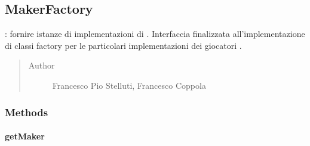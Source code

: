 \documentclass[letterpaper,10pt,italian,openany,oneside]{sphinxmanual}
\begin{document}
\begin{fulllineitems}
\label{\detokenize{test/it/unicam/cs/pa/mastermind/factories/InteractiveMakerFactory:it.unicam.cs.pa.mastermind.factories.InteractiveMakerFactory.getName()}}
\end{fulllineitems}



\subsection{MakerFactory}
\label{\detokenize{test/it/unicam/cs/pa/mastermind/factories/MakerFactory:makerfactory}}\label{\detokenize{test/it/unicam/cs/pa/mastermind/factories/MakerFactory::doc}}

\begin{fulllineitems}
\label{\detokenize{test/it/unicam/cs/pa/mastermind/factories/MakerFactory:it.unicam.cs.pa.mastermind.factories.MakerFactory}}
: fornire istanze di implementazioni di . Interfaccia finalizzata all’implementazione di classi factory per le particolari implementazioni dei giocatori .
\begin{quote}\begin{description}
\item[{Author}] \leavevmode
Francesco Pio Stelluti, Francesco Coppola

\end{description}\end{quote}

\end{fulllineitems}



\subsubsection{Methods}
\label{\detokenize{test/it/unicam/cs/pa/mastermind/factories/MakerFactory:methods}}

\paragraph{getMaker}
\label{\detokenize{test/it/unicam/cs/pa/mastermind/factories/MakerFactory:getmaker}}
\end{document}
